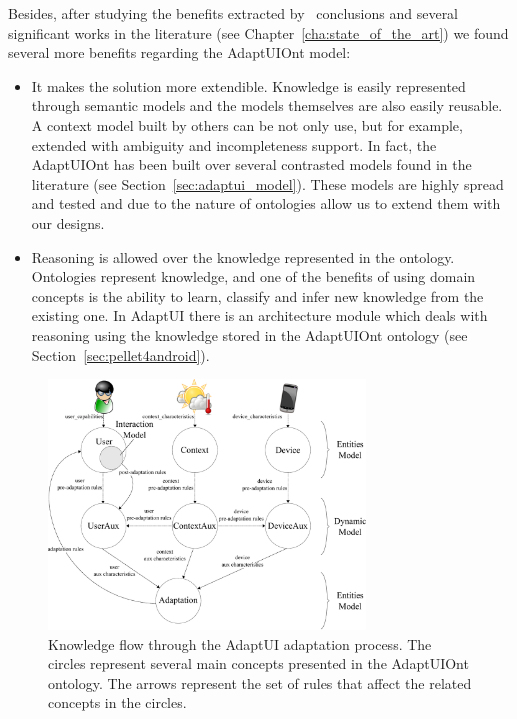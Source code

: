 Besides, after studying the benefits extracted by~\citet{strang_context_2004}
conclusions and several significant works in the literature (see
Chapter~\ref{cha:state_of_the_art}) we found several more benefits regarding the
AdaptUIOnt model:

\begin{itemize}
  \item It makes the solution more extendible. Knowledge is easily represented
  through semantic models and the models themselves are also easily reusable.
  A context model built by others can be not only use, but for example, extended
  with ambiguity and incompleteness support. In fact, the AdaptUIOnt has been
  built over several contrasted models found in the literature (see
  Section~\ref{sec:adaptui_model}). These models are highly spread and tested
  and due to the nature of ontologies allow us to extend them with our designs.
  
  \item Reasoning is allowed over the knowledge represented in the ontology.
  Ontologies represent knowledge, and one of the benefits of using domain
  concepts is the ability to learn, classify and infer new knowledge from the
  existing one. In AdaptUI there is an architecture module which deals with
  reasoning using the knowledge stored in the AdaptUIOnt ontology (see
  Section~\ref{sec:pellet4android}).
\end{itemize}




\begin{figure}[H]
\centering
\includegraphics[width=0.75\textwidth]{../figures/PDF/flow_diagram.pdf}
\caption{Knowledge flow through the AdaptUI adaptation process. The circles
represent several main concepts presented in the AdaptUIOnt ontology. The arrows
represent the set of rules that affect the related concepts in the circles.}
\label{fig:flow_diagram_2}
\end{figure}

